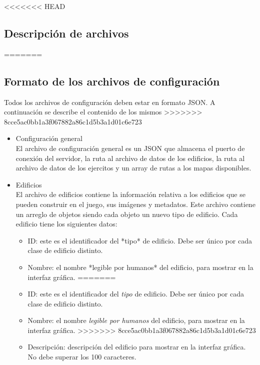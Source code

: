 \documentclass[titlepage,a4paper,12pt]{article}
\begin{document}
<<<<<<< HEAD
\subsection{Descripción de archivos}
=======
\subsection{Formato de los archivos de configuración}

Todos los archivos de configuración deben estar en formato JSON. A continuación se describe el contenido de los mismos
>>>>>>> 8cce5ac0bb1a3f067882a86c1d5b3a1d01c6e723

\begin{itemize}

\item Configuración general\\

El archivo de configuración general es un JSON que almacena el puerto de conexión del servidor, la ruta al archivo de datos de los edificios, la ruta al archivo de datos de los ejercitos y un array de rutas a los mapas disponibles.

\item Edificios\\

El archivo de edificios contiene la información relativa a los edificios que se pueden construir en el juego, sus imágenes y metadatos. Este archivo contiene un arreglo de objetos siendo cada objeto un nuevo tipo de edificio. Cada edificio tiene los siguientes datos: 

\begin{itemize}

<<<<<<< HEAD
\item ID:  este es el identificador del *tipo* de edificio. Debe ser único por cada clase de edificio distinto.

\item Nombre: el nombre *legible por humanos* del edificio, para mostrar en la interfaz gráfica.
=======
\item ID:  este es el identificador del \textit{tipo} de edificio. Debe ser único por cada clase de edificio distinto.

\item Nombre: el nombre \textit{legible por humanos} del edificio, para mostrar en la interfaz gráfica.
>>>>>>> 8cce5ac0bb1a3f067882a86c1d5b3a1d01c6e723

\item Descripción: descripción del edificio para mostrar en la interfaz gráfica. No debe superar los 100 caracteres.


\end{itemize}
\end{itemize}
\end{document}
